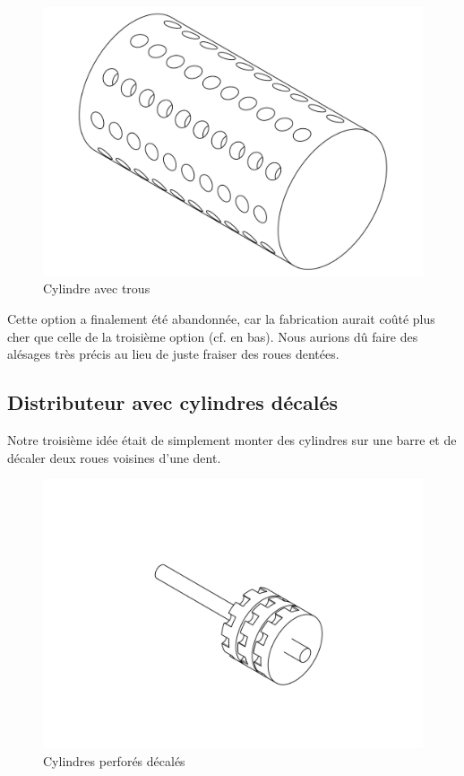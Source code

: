 \begin{figure}
    \centering
    \includegraphics[width=\textwidth]{Graphics/Roue/DRAWING_PROTOTYP_CYLINDRE.pdf}
    \caption{Cylindre avec trous}
\end{figure}

Cette option a finalement été abandonnée, car la fabrication aurait coûté plus cher que celle de la troisième option (cf. en bas). Nous aurions dû faire des alésages très précis au lieu de juste fraiser des roues dentées.

\subsection{Distributeur avec cylindres décalés}
Notre troisième idée était de simplement monter des cylindres sur une barre et de décaler deux roues voisines d'une dent.

\begin{figure}
    \centering
    \includegraphics[width=\textwidth]{Graphics/Roue/DRAWING_ROUES_DENTEES_DECALES.pdf}
    \caption{Cylindres perforés décalés}
\end{figure}

